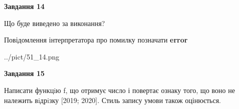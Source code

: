 \documentclass[11pt, ukrainian]{article}
\begin{document}
{\begin {large}
{\begin {center}\textbf{Завдання 14}\end {center}}\par
Що буде виведено за виконання? \par
Повідомлення інтерпретатора про помилку позначати \textbf{error}

\begin{center}
	{../pict/51_14.png}
\end{center}
\newpage

{\begin {center}\textbf{Завдання 15}\end {center}}\par

Написати функцiю f, що отримує число і повертає ознаку того, що воно не належить вiдрiзку [2019; 2020]. Стиль запису умови також оцінюється.\par
\newpage

\end {large}}
\end{document}
